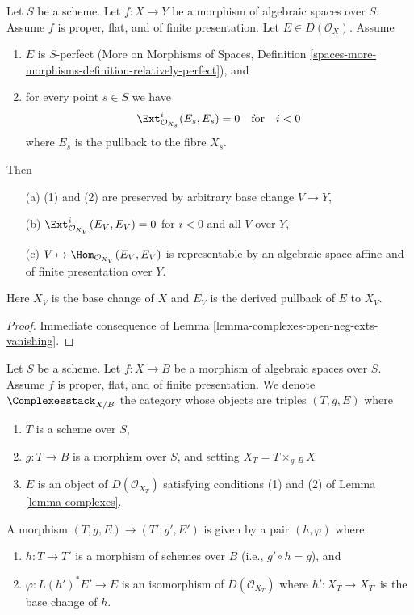 \begin{lemma}
\label{lemma-complexes}
Let $S$ be a scheme. Let $f : X \to Y$ be a morphism of algebraic
spaces over $S$. Assume $f$ is proper, flat, and of finite presentation.
Let $E \in D(\mathcal{O}_X)$.
Assume
\begin{enumerate}
\item $E$ is $S$-perfect (More on Morphisms of Spaces, Definition
\ref{spaces-more-morphisms-definition-relatively-perfect}), and
\item for every point $s \in S$ we have
$$
\Ext^i_{\mathcal{O}_{X_s}}(E_s, E_s) = 0
\quad\text{for}\quad i < 0
$$
where $E_s$ is the pullback to the fibre $X_s$.
\end{enumerate}
Then
\begin{enumerate}
\item[(a)] (1) and (2) are preserved by arbitrary base change $V \to Y$,
\item[(b)] $\Ext^i_{\mathcal{O}_{X_V}}(E_V, E_V) = 0$ for $i < 0$
and all $V$ over $Y$,
\item[(c)] $V \mapsto \Hom_{\mathcal{O}_{X_V}}(E_V, E_V)$ is representable
by an algebraic space affine and of finite presentation over $Y$.
\end{enumerate}
Here $X_V$ is the base change of $X$ and $E_V$ is the derived pullback
of $E$ to $X_V$.
\end{lemma}

\begin{proof}
Immediate consequence of Lemma \ref{lemma-complexes-open-neg-exts-vanishing}.
\end{proof}

\begin{situation}
\label{situation-complexes}
Let $S$ be a scheme. Let $f : X \to B$ be a morphism of algebraic spaces
over $S$. Assume $f$ is proper, flat, and of finite presentation.
We denote $\Complexesstack_{X/B}$ the category whose objects are
triples $(T, g, E)$ where
\begin{enumerate}
\item $T$ is a scheme over $S$,
\item $g : T \to B$ is a morphism over $S$, and setting
$X_T = T \times_{g, B} X$
\item $E$ is an object of $D(\mathcal{O}_{X_T})$ satisfying
conditions (1) and (2) of Lemma \ref{lemma-complexes}.
\end{enumerate}
A morphism $(T, g, E) \to (T', g', E')$
is given by a pair $(h, \varphi)$ where
\begin{enumerate}
\item $h : T \to T'$ is a morphism of schemes over $B$
(i.e., $g' \circ h = g$), and
\item $\varphi : L(h')^*E' \to E$ is an
isomorphism of $D(\mathcal{O}_{X_T})$ where $h' : X_T \to X_{T'}$
is the base change of $h$.
\end{enumerate}
\end{situation}

